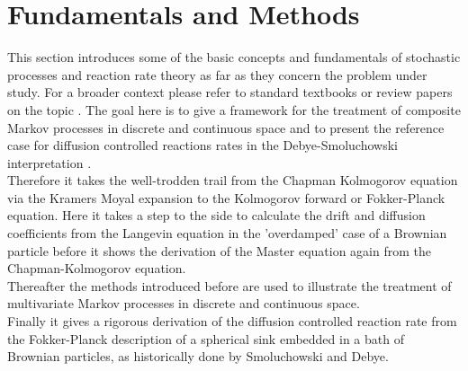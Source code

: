 \chapter{Fundamentals and Methods}
\label{Short_Introduction_to_Stochastic_Processes}
This section introduces some of the basic concepts and fundamentals of stochastic processes and reaction rate theory as 
far as they concern the problem under study. For a broader context please refer to standard textbooks \cite{VanKampen1992, doob1953stochastic, ross1996stochastic} 
or review papers on the topic \cite{Calef1983a, Bressloff2013}. The goal here is to give a framework for the treatment of 
composite Markov processes in discrete and continuous space and to present the reference case for diffusion controlled 
reactions rates in the Debye-Smoluchowski interpretation \cite{Smoluchowski1917a, Debye1942}. \\
Therefore it takes the well-trodden trail from the Chapman Kolmogorov equation via the Kramers Moyal expansion to the 
Kolmogorov forward or Fokker-Planck equation. Here it takes a step to the side to calculate the drift and diffusion 
coefficients from the Langevin equation in the 'overdamped' case of a Brownian particle before it shows the derivation 
of the Master equation again from the Chapman-Kolmogorov equation.\\
Thereafter the methods introduced before are used to illustrate the treatment of multivariate Markov processes in discrete 
and continuous space. \\
Finally it gives a rigorous derivation of the diffusion controlled reaction rate from the Fokker-Planck description of 
a spherical sink embedded in a bath of Brownian particles, as historically done by Smoluchowski and Debye.
